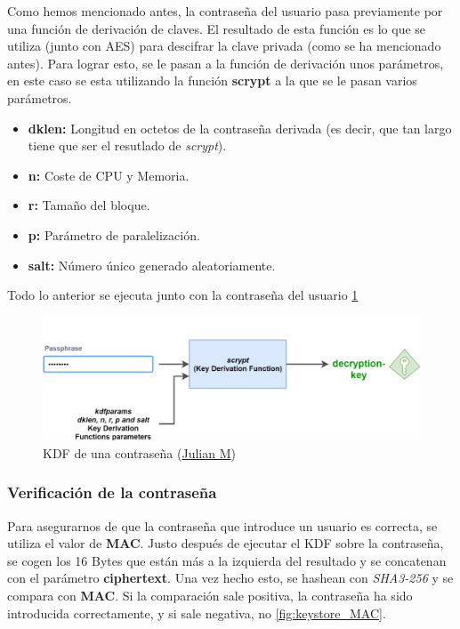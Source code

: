 Como hemos mencionado antes, la contraseña del usuario pasa previamente por una función de derivación de claves. El resultado de esta función es lo que se utiliza (junto con AES) para descifrar la clave privada (como se ha mencionado antes). Para lograr esto, se le pasan a la función de derivación unos parámetros, en este caso se esta utilizando la función \textbf{scrypt}\cite{scrypt} a la que se le pasan varios parámetros.
\begin{itemize}
\item \textbf{dklen:} Longitud en octetos de la contraseña derivada (es decir, que tan largo tiene que ser el resutlado de \emph{scrypt}).
\item \textbf{n:} Coste de CPU y Memoria.
\item \textbf{r:} Tamaño del bloque.
\item \textbf{p:} Parámetro de paralelización.
\item \textbf{salt:} Número único generado aleatoriamente.
\end{itemize}

Todo lo anterior se ejecuta junto con la contraseña del usuario \ref{fig:keystore_scrypt}

\begin{figure}[h!]
  \centering
  \includegraphics[width=0.8\linewidth]{figs/Desarrollo/Keystore/keystore_scrypt}
  \caption[KDF de una contraseña]{KDF de una contraseña (\href{https://julien-maffre.medium.com/what-is-an-ethereum-keystore-file-86c8c5917b97}{Julian M})}
  \label{fig:keystore_scrypt}
\end{figure}

\vspace{5cm}
\subsubsection{Verificación de la contraseña}

Para asegurarnos de que la contraseña que introduce un usuario es correcta, se utiliza el valor de \textbf{MAC}. Justo después de ejecutar el KDF sobre la contraseña, se cogen los 16 Bytes que están más a la izquierda del resultado y se concatenan con el parámetro \textbf{ciphertext}. Una vez hecho esto, se hashean con \emph{SHA3-256}\cite{sha3} y se compara con \textbf{MAC}. Si la comparación sale positiva, la contraseña ha sido introducida correctamente, y si sale negativa, no \ref{fig:keystore_MAC}.

